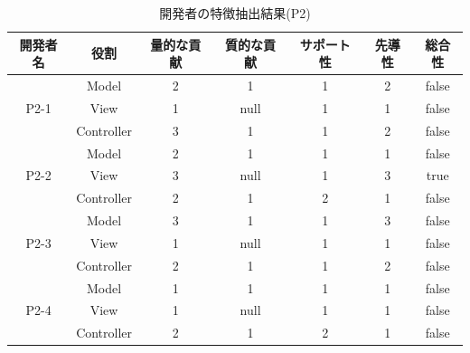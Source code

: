 \documentclass{funthesis}
\begin{document}
\begin{table}[htb]
  \begin{center}
\begin{tabular}{|c|c|c|c|c|c|c|}
\hline
開発者名 & 役割 & 量的な貢献 & 質的な貢献 & サポート性 & 先導性 & 総合性\\ \hline
& Model & 2 & 1 & 1 & 2 & false\\ \cline{2-7}
P2-1 & View & 1 & null & 1 & 1 & false\\ \cline{2-7}
& Controller & 3 & 1 & 1 & 2 & false \\ \hline \hline

& Model & 2 & 1 & 1 & 1 & false\\ \cline{2-7}
P2-2 & View & 3 & null & 1 & 3 & true\\ \cline{2-7}
& Controller & 2 & 1 & 2 & 1 & false \\ \hline \hline

& Model & 3 & 1 & 1 & 3 & false\\ \cline{2-7}
P2-3 & View & 1 & null & 1 & 1 & false\\ \cline{2-7}
& Controller & 2 & 1 & 1 & 2 & false \\ \hline \hline

& Model & 1 & 1 & 1 & 1 & false\\ \cline{2-7}
P2-4 & View & 1 & null& 1 & 1 & false\\ \cline{2-7}
& Controller & 2 & 1 & 2 & 1 & false \\ \hline
\end{tabular}
  \end{center}
  \caption{開発者の特徴抽出結果(P2)}    \label{sample}
\end{table}
\end{document}
